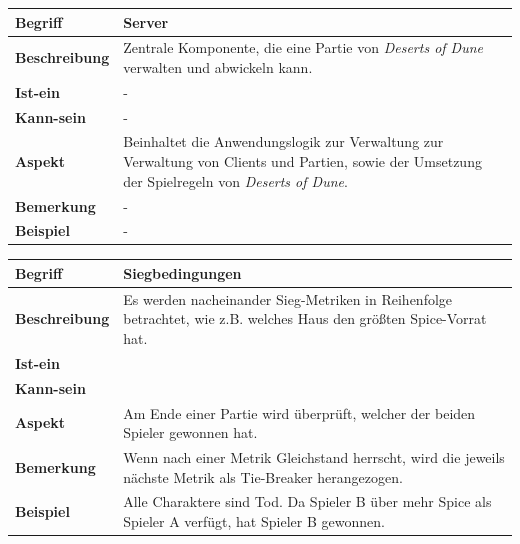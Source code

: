 \documentclass[12pt]{article}
\begin{document}
\begin{tabularx}{16cm}{|l|X|}
\hline
\textbf{Begriff} & \textbf{Server} \\
\hline
\textbf{Beschreibung} & Zentrale Komponente, die eine Partie von \textit{Deserts of Dune} verwalten und abwickeln kann. \\
\hline
\textbf{Ist-ein} & - \\
\hline
\textbf{Kann-sein} & - \\
\hline
\textbf{Aspekt} & Beinhaltet die Anwendungslogik zur Verwaltung zur Verwaltung von Clients und Partien, sowie der Umsetzung der Spielregeln von \textit{Deserts of Dune}. \\
\hline
\textbf{Bemerkung} & - \\
\hline
\textbf{Beispiel} & - \\
\hline
\end{tabularx}

\begin{tabularx}{16cm}{|l|X|}
\hline
\textbf{Begriff} & \textbf{Siegbedingungen} \\
\hline
\textbf{Beschreibung} & Es werden nacheinander Sieg-Metriken in Reihenfolge betrachtet, wie z.B. welches Haus den größten Spice-Vorrat hat. \\
\hline
\textbf{Ist-ein} & \\
\hline
\textbf{Kann-sein} & \\
\hline
\textbf{Aspekt} & Am Ende einer Partie wird überprüft, welcher der beiden Spieler gewonnen hat. \\
\hline
\textbf{Bemerkung} & Wenn nach einer Metrik Gleichstand herrscht, wird die jeweils nächste Metrik als Tie-Breaker herangezogen. \\
\hline
\textbf{Beispiel} & Alle Charaktere sind Tod. Da Spieler B über mehr Spice als Spieler A verfügt, hat Spieler B gewonnen. \\
\hline
\end{tabularx}
\end{document}
